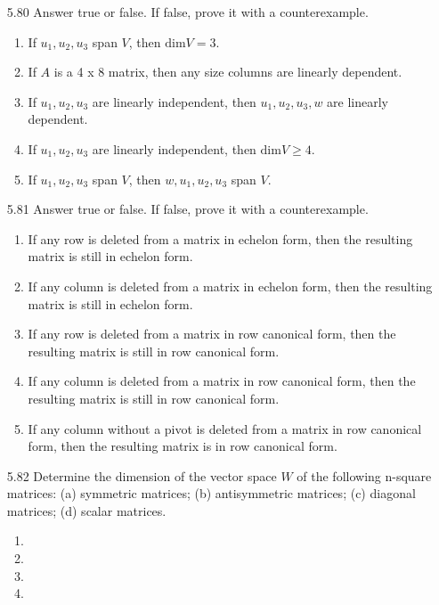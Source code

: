 \documentclass[12pt]{article}
\begin{document}
\begin{enumerate}
\item[5.80] Answer true or false. If false, prove it with a counterexample.
	\begin{enumerate}
	\item If $u_1,u_2,u_3$ span $V$, then $\mathrm{dim}V = 3$.
	\item If $A$ is a 4 x 8 matrix, then any size columns are linearly dependent.
	\item If $u_1,u_2,u_3$ are linearly independent, then $u_1,u_2,u_3,w$ are linearly dependent.
	\item If $u_1,u_2,u_3$ are linearly independent, then $\mathrm{dim}V \geq 4$.
	\item If $u_1,u_2,u_3$ span $V$, then $w,u_1,u_2,u_3$ span $V$.
	\end{enumerate}

\item[5.81] Answer true or false. If false, prove it with a counterexample.
	\begin{enumerate}
	\item If any row is deleted from a matrix in echelon form, then the resulting matrix is still in echelon form.
	\item If any column is deleted from a matrix in echelon form, then the resulting matrix is still in echelon form.
	\item If any row is deleted from a matrix in row canonical form, then the resulting matrix is still in row canonical form.
	\item If any column is deleted from a matrix in row canonical form, then the resulting matrix is still in row canonical form.
	\item If any column without a pivot is deleted from a matrix in row canonical form, then the resulting matrix is in row canonical form.
	\end{enumerate}

\item[5.82] Determine the dimension of the vector space $W$ of the following n-square matrices: (a) symmetric matrices; (b) antisymmetric matrices; (c) diagonal matrices; (d) scalar matrices.
	\begin{enumerate}
	\item
	\item
	\item
	\item
	\end{enumerate}
\end{enumerate}
\end{document}
